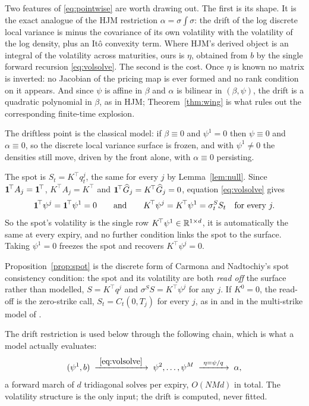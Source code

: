 Two features of \eqref{eq:pointwise} are worth drawing out. The first is its
shape. It is the exact analogue of the HJM restriction $\alpha=\sigma\int\sigma$:
the drift of the log discrete local variance is minus the covariance of its own
volatility with the volatility of the log density, plus an It\^o convexity term.
Where HJM's derived object is an integral of the volatility across maturities,
ours is $\eta$, obtained from $b$ by the single forward recursion
\eqref{eq:volsolve}. The second is the cost. Once $\eta$ is known no matrix is inverted: no Jacobian
of the pricing map is ever formed and no rank condition on it appears. And since
$\psi$ is affine in $\beta$ and $\alpha$ is bilinear in $(\beta,\psi)$, the drift
is a quadratic polynomial in $\beta$, as in HJM; Theorem~\ref{thm:wing} is what
rules out the corresponding finite-time explosion.

The driftless point is the classical model: if $\beta\equiv0$ and $\psi^1=0$ then
$\psi\equiv0$ and $\alpha\equiv0$, so the discrete local variance surface is
frozen, and with $\psi^1\ne0$ the densities still move, driven by the front alone,
with $\alpha\equiv0$ persisting.

\begin{proposition}\label{prop:spot}
The spot is $S_t=K^{\!\top}q^{j}_t$, the same for every $j$ by
Lemma~\ref{lem:null}. Since $\mathbf 1^{\!\top}A_j=\mathbf 1^{\!\top}$, $K^{\!\top}A_j=K^{\!\top}$ and
$\mathbf 1^{\!\top}\widehat G_j=K^{\!\top}\widehat G_j=0$, equation \eqref{eq:volsolve} gives
\[
  \mathbf 1^{\!\top}\psi^{j}=\mathbf 1^{\!\top}\psi^{1}=0
  \qquad\text{and}\qquad
  K^{\!\top}\psi^{j}=K^{\!\top}\psi^{1}=\sigma^{S}_tS_t
  \quad\text{for every }j.
\]
So the spot's volatility is the single row $K^{\!\top}\psi^{1}\in\mathbb R^{1\times d}$, it is
automatically the same at every expiry, and no further condition links the spot
to the surface. Taking $\psi^{1}=0$ freezes the spot and recovers
$K^{\!\top}\psi^{j}=0$.
\end{proposition}

Proposition~\ref{prop:spot} is the discrete form of Carmona and Nadtochiy's spot
consistency condition: the spot and its volatility are both \emph{read off} the
surface rather than modelled, $S=K^{\!\top}q^j$ and $\sigma^SS=K^{\!\top}\psi^j$
for any $j$. If $K^0=0$, the read-off is the zero-strike call,
$S_t=C_t(0,T_j)$ for every $j$, as in \cite{Wissel2007} and in the multi-strike model
of \cite{SchweizerWissel2008}.

The drift restriction is used below through the following chain, which is what a
model actually evaluates:
\begin{equation}\label{eq:pipeline}
  (\psi^1,b)\;\xrightarrow{\ \eqref{eq:volsolve}\ }\;\psi^2,\dots,\psi^M
  \;\xrightarrow{\ \eta=\psi/q\ }\;\alpha ,
\end{equation}
a forward march of $d$ tridiagonal solves per expiry, $O(NMd)$ in total. The
volatility structure is the only input; the drift is computed, never fitted.
